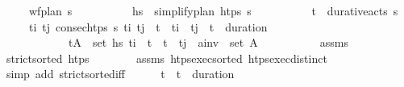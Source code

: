 \begin{isabellebody}
\ \ \ \ \ {\isachardoublequoteopen}wf{\isacharunderscore}{\kern0pt}plan\ {\isasympi}s{\isachardoublequoteclose}\ \isanewline
\ \ \ \ \ \ \ \ \ {\isachardoublequoteopen}hs\ {\isacharequal}{\kern0pt}\ simplify{\isacharunderscore}{\kern0pt}plan\ htps\ {\isasympi}s{\isachardoublequoteclose}\ \isanewline
\ \ \ \ \ \ \ \ \ {\isachardoublequoteopen}{\isacharparenleft}{\kern0pt}t\isactrlsub {\isasympi}{\isacharcomma}{\kern0pt}{\isasympi}{\isacharparenright}{\kern0pt}\ {\isasymin}\ durative{\isacharunderscore}{\kern0pt}acts\ {\isasympi}s{\isachardoublequoteclose}\isanewline
\ \ \ \ \ {\isachardoublequoteopen}{\isasymforall}t\isactrlsub i\ t\isactrlsub j{\isachardot}{\kern0pt}\ {\isacharparenleft}{\kern0pt}consec{\isacharunderscore}{\kern0pt}htps\ {\isasympi}s\ t\isactrlsub i\ t\isactrlsub j\ {\isasymand}\ t\isactrlsub {\isasympi}\ {\isasymle}\ t\isactrlsub i\ {\isasymand}\ t\isactrlsub j\ {\isasymle}\ t\isactrlsub {\isasympi}\ {\isacharplus}{\kern0pt}\ duration\ {\isasympi}{\isacharparenright}{\kern0pt}\ {\isasymlongrightarrow}\ \isanewline
\ \ \ \ \ \ \ \ \ \ \ \ {\isacharparenleft}{\kern0pt}{\isasymexists}{\isacharparenleft}{\kern0pt}t{\isacharprime}{\kern0pt}{\isacharcomma}{\kern0pt}A{\isacharparenright}{\kern0pt}\ {\isasymin}\ set\ hs{\isachardot}{\kern0pt}\ t\isactrlsub i\ {\isacharless}{\kern0pt}\ t{\isacharprime}{\kern0pt}\ {\isasymand}\ t{\isacharprime}{\kern0pt}\ {\isacharless}{\kern0pt}\ t\isactrlsub j\ {\isasymand}\ a\isactrlsub i\isactrlsub n\isactrlsub v\ {\isasymin}\ set\ A{\isacharparenright}{\kern0pt}{\isachardoublequoteclose}\isanewline
\ \ \ \ \isanewline
%
\isadelimproof
\ \ \ \ %
\endisadelimproof
%
\isatagproof
{}\isamarkupfalse%
\ assms\isanewline
\ \ \isamarkupfalse%
\ {\isacharminus}{\kern0pt}\isanewline
\ \ \ \ \isamarkupfalse%
\ {\isachardoublequoteopen}strict{\isacharunderscore}{\kern0pt}sorted\ htps{\isachardoublequoteclose}\isanewline
\ \ \ \ \ \ \isamarkupfalse%
\ assms\ htps{\isacharunderscore}{\kern0pt}exec{\isacharunderscore}{\kern0pt}sorted\ htps{\isacharunderscore}{\kern0pt}exec{\isacharunderscore}{\kern0pt}distinct\ \isamarkupfalse%
\ {\isacharparenleft}{\kern0pt}simp\ add{\isacharcolon}{\kern0pt}\ strict{\isacharunderscore}{\kern0pt}sorted{\isacharunderscore}{\kern0pt}iff{\isacharparenright}{\kern0pt}\isanewline
\ \ \ \ \isamarkupfalse%
\ {\isachardoublequoteopen}t\isactrlsub {\isasympi}\ {\isasymle}\ t\isactrlsub {\isasympi}\ {\isacharplus}{\kern0pt}\ duration\ {\isasympi}{\isachardoublequoteclose}\isanewline

\end{isabellebody}
